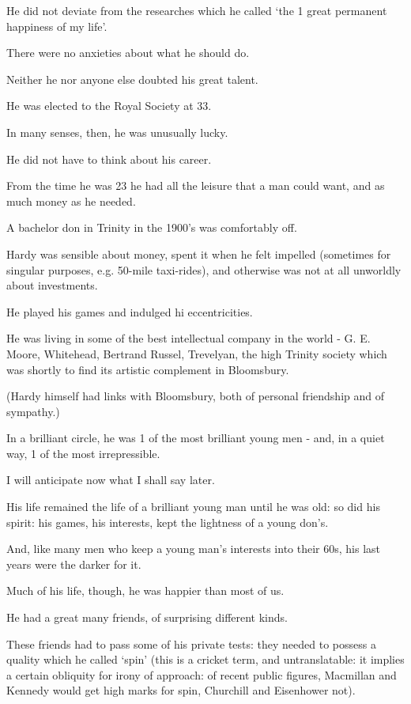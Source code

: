 \documentclass{article}
\numberwithin{equation}{section}
\begin{document}
He did not deviate from the researches which he called `the 1 great permanent happiness of my life'.

There were no anxieties about what he should do.

Neither he nor anyone else doubted his great talent.

He was elected to the Royal Society at 33.

%
In many senses, then, he was unusually lucky.

He did not have to think about his career.

From the time he was 23 he had all the leisure that a man could want, and as much money as he needed.

A bachelor don in Trinity in the 1900's was comfortably off.

Hardy was sensible about money, spent it when he felt impelled (sometimes for singular purposes, e.g. 50-mile taxi-rides), and otherwise was not at all unworldly about investments.

He played his games and indulged hi eccentricities.

He was living in some of the best intellectual company in the world - G. E. Moore, Whitehead, Bertrand Russel, Trevelyan, the high Trinity society which was shortly to find its artistic complement in Bloomsbury.

(Hardy himself had links with Bloomsbury, both of personal friendship and of sympathy.)

In a brilliant circle, he was 1 of the most brilliant young men - and, in a quiet way, 1 of the most irrepressible.

%
I will anticipate now what I shall say later.

His life remained the life of a brilliant young man until he was old: so did his spirit: his games, his interests, kept the lightness of a young don's.

And, like many men who keep a young man's interests into their 60s, his last years were the darker for it.

%
Much of his life, though, he was happier than most of us.

He had a great many friends, of surprising different kinds.

These friends had to pass some of his private tests: they needed to possess a quality which he called `spin' (this is a cricket term, and untranslatable: it implies a certain obliquity for irony of approach: of recent public figures, Macmillan and Kennedy would get high marks for spin, Churchill and Eisenhower not).
\end{document}
